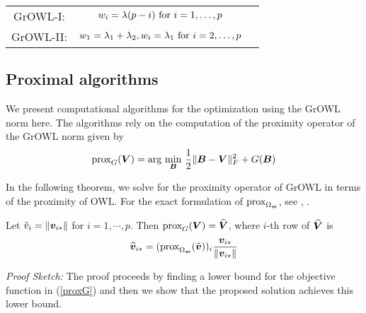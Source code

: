 
    \begin{tabular}[b]{ccc}
    \hline
    	GrOWL-I:	& $w_i = \lambda (p - i) \textnormal{ for } i = 1, \dots,  p $   &\\
	GrOWL-II:	& $w_1 = \lambda_1 +  \lambda_2, w_i = \lambda_1 \textnormal{ for } i = 2, \dots,  p$  &\\ \hline
	    \end{tabular}




\subsection{Proximal algorithms}
We present computational algorithms for the optimization using the GrOWL norm
here. The algorithms rely on the computation of the proximity operator
\citep{prox} of the GrOWL norm given by
\begin{eqnarray}\label{proxG}
\textnormal{prox}_{G}(\bV) = \textnormal{arg} \underset{\bB}{ \textnormal{ min } } \frac{1}{2}\|\bB - \bV\|_F^2 + G(\bB) 
\end{eqnarray}

In the following theorem, we solve for the proximity operator of GrOWL in terms
of the proximity of OWL. For the exact formulation of
$\textnormal{prox}_{\Omega_{\boldsymbol{w}}}$, see \cite{candes13},
\citep{ZengFigueiredo2014}.

\begin{theorem} Let $\tilde{v}_i = \| \boldsymbol{v}_{i {\ast}}\|$ for $i = 1, \cdots, p$. Then
$\textnormal{prox}_{G}(\boldsymbol{V}) = \widehat {\boldsymbol{V}}$, where $i$-th row of $\widehat {\boldsymbol{V}}$ is
\begin{eqnarray}\label{Vhat}
\widehat \bv_{i \a} =  (\textnormal{prox}_{\Omega_{\bw}}(\tilde{\bv}))_i \frac{\bv_{i\a}}{\|\bv_{i \a}\|}
\end{eqnarray}
\end{theorem}

\textit{Proof Sketch:}
The proof proceeds by finding a lower bound for the objective function in
(\ref{proxG}) and then we show that the proposed solution achieves this lower
bound.
